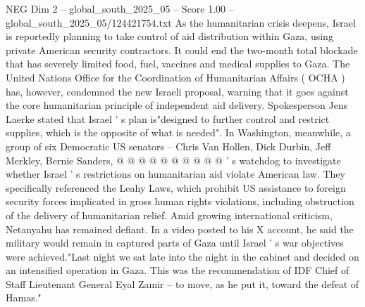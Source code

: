 \begin{textsample}{NEG Dim 2 – global\_south\_2025\_05 – Score 1.00 – global\_south\_2025\_05/124421754.txt}
As the humanitarian crisis deepens, Israel is reportedly planning to take control of aid distribution within Gaza, using private American security contractors.
It could end the two-month total blockade that has severely limited food, fuel, vaccines and medical supplies to Gaza.
The United Nations Office for the Coordination of Humanitarian Affairs ( OCHA ) has, however, condemned the new Israeli proposal, warning that it goes against the core humanitarian principle of independent aid delivery.
Spokesperson Jens Laerke stated that Israel ' s plan is"designed to further control and restrict supplies, which is the opposite of what is needed".
In Washington, meanwhile, a group of six Democratic US senators -- Chris Van Hollen, Dick Durbin, Jeff Merkley, Bernie Sanders, @ @ @ @ @ @ @ @ @ @ ' s watchdog to investigate whether Israel ' s restrictions on humanitarian aid violate American law.
They specifically referenced the Leahy Laws, which prohibit US assistance to foreign security forces implicated in gross human rights violations, including obstruction of the delivery of humanitarian relief.
Amid growing international criticism, Netanyahu has remained defiant.
In a video posted to his X account, he said the military would remain in captured parts of Gaza until Israel ' s war objectives were achieved."Last night we sat late into the night in the cabinet and decided on an intensified operation in Gaza.
This was the recommendation of IDF Chief of Staff Lieutenant General Eyal Zamir -- to move, as he put it, toward the defeat of Hamas."

\end{textsample}
